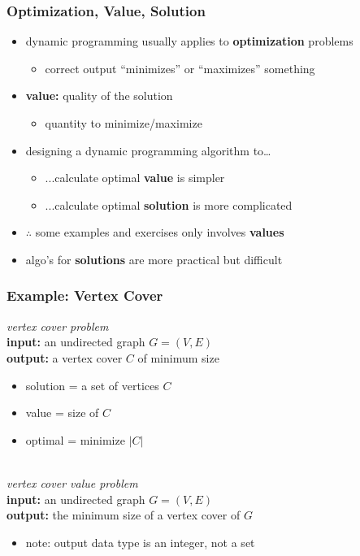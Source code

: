 \documentclass{beamer}
\newcommand{\stanza}{ \\~\ }
\begin{document}
\begin{frame} \frametitle{Optimization, Value, Solution}
\begin{itemize}
  \item dynamic programming usually applies to \textbf{optimization} problems
  \begin{itemize}
    \item correct output ``minimizes'' or ``maximizes'' something
  \end{itemize}
  \item \textbf{value:} quality of the solution
  \begin{itemize}
    \item quantity to minimize/maximize
  \end{itemize} 
  \item designing a dynamic programming algorithm to\dots
  \begin{itemize}
    \item ...calculate optimal \textbf{value} is simpler
    \item ...calculate optimal \textbf{solution} is more complicated
  \end{itemize}
  \item $\therefore$ some examples and exercises only involves \textbf{values}
  \item algo's for \textbf{solutions} are more practical but difficult
\end{itemize}
\end{frame}

\begin{frame} \frametitle{Example: Vertex Cover}
\emph{vertex cover problem} \\
\textbf{input:} an undirected graph $G=(V, E)$ \\
\textbf{output:} a vertex cover $C$ of minimum size
\begin{itemize}
  \item solution = a set of vertices $C$
  \item value = size of $C$
  \item optimal = minimize $|C|$ \stanza
\end{itemize}

\emph{vertex cover value problem} \\
\textbf{input:} an undirected graph $G=(V, E)$ \\
\textbf{output:} the minimum size of a vertex cover of $G$
\begin{itemize}
  \item note: output data type is an integer, not a set
\end{itemize}
\end{frame}
\end{document}
